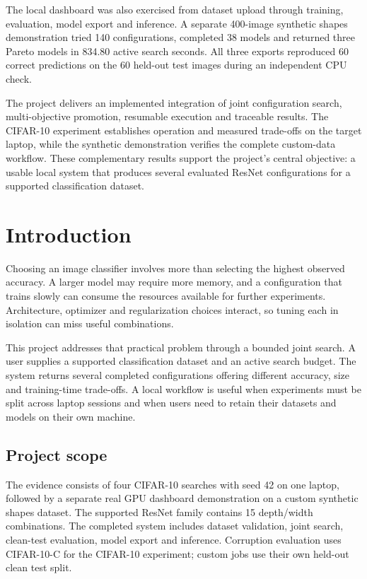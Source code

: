 \documentclass[11pt,a4paper,oneside]{report}
\begin{document}
The local dashboard was also exercised from dataset upload through training, evaluation, model export and inference. A separate 400-image synthetic shapes demonstration tried 140 configurations, completed 38 models and returned three Pareto models in 834.80 active search seconds. All three exports reproduced 60 correct predictions on the 60 held-out test images during an independent CPU check.

The project delivers an implemented integration of joint configuration search, multi-objective promotion, resumable execution and traceable results. The CIFAR-10 experiment establishes operation and measured trade-offs on the target laptop, while the synthetic demonstration verifies the complete custom-data workflow. These complementary results support the project's central objective: a usable local system that produces several evaluated ResNet configurations for a supported classification dataset.
\clearpage
\begingroup\small\setlength{\parskip}{0pt}\singlespacing
\tableofcontents
\endgroup
\clearpage
{}
\chapter{Introduction}
Choosing an image classifier involves more than selecting the highest observed accuracy. A larger model may require more memory, and a configuration that trains slowly can consume the resources available for further experiments. Architecture, optimizer and regularization choices interact, so tuning each in isolation can miss useful combinations.

This project addresses that practical problem through a bounded joint search. A user supplies a supported classification dataset and an active search budget. The system returns several completed configurations offering different accuracy, size and training-time trade-offs. A local workflow is useful when experiments must be split across laptop sessions and when users need to retain their datasets and models on their own machine.
\section{Project scope}
The evidence consists of four CIFAR-10 searches with seed 42 on one laptop, followed by a separate real GPU dashboard demonstration on a custom synthetic shapes dataset. The supported ResNet family contains 15 depth/width combinations. The completed system includes dataset validation, joint search, clean-test evaluation, model export and inference. Corruption evaluation uses CIFAR-10-C for the CIFAR-10 experiment; custom jobs use their own held-out clean test split.
\end{document}
